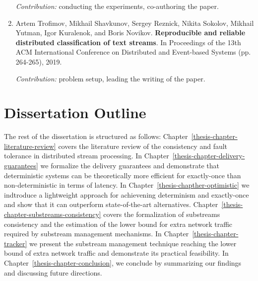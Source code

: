 \begin{enumerate}
    \textit{Contribution:} conducting the experiments, co-authoring the paper.

    \item Artem Trofimov, Mikhail Shavkunov, Sergey Reznick, Nikita Sokolov, Mikhail Yutman, Igor Kuralenok, and Boris Novikov. \textbf{Reproducible and reliable distributed classification of text streams}. In Proceedings of the 13th ACM International Conference on Distributed and Event-based Systems (pp. 264-265), 2019. \newline
    
    \textit{Contribution:} problem setup, leading the writing of the paper.
\end{enumerate}

\section{Dissertation Outline}

The rest of the dissertation is structured as follows: Chapter~\ref{thesis-chapter-literature-review} covers the literature review of the consistency and fault tolerance in distributed stream processing. In Chapter~\ref{thesis-chapter-delivery-guarantees} we formalize the delivery guarantees and demonstrate that deterministic systems can be theoretically more efficient for exactly-once than non-deterministic in terms of latency. In Chapter~\ref{thesis-chapther-optimistic} we indtroduce a lightweight approach for achievening determinism and exactly-once and show that it can outperform state-of-the-art alternatives. Chapter~\ref{thesis-chapter-substreams-consistency} covers the formalization of substreams consistency and the estimation of the lower bound for extra network traffic required by substream management mechanisms. In Chapter~\ref{thesis-chapter-tracker} we present the substream management technique reaching the lower bound of extra network traffic and demonstrate its practical feasibility. In Chapter~\ref{thesis-chapter-conclusion}, we conclude by summarizing our findings and discussing future directions.